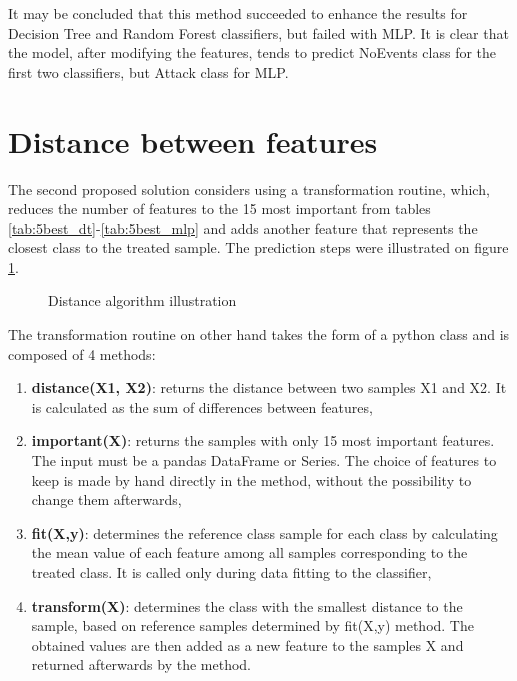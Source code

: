 It may be concluded that this method succeeded to enhance the results for Decision Tree and Random Forest classifiers, but failed with MLP. It is clear that the model, after modifying the features, tends to predict NoEvents class for the first two classifiers, but Attack class for MLP.  

\section{Distance between features}
The second proposed solution considers using a transformation routine, which, reduces the number of features to the 15 most important from tables \ref{tab:5best_dt}-\ref{tab:5best_mlp} and adds another feature that represents the closest class to the treated sample. The prediction steps were illustrated on figure \ref{fig:distill}.

\begin{figure}[H]
    \centering
    \caption{Distance algorithm illustration}
    \label{fig:distill}
\end{figure}

The transformation routine on other hand takes the form of a python class and is composed of 4 methods:
\begin{enumerate}
    \item \textbf{distance(X1, X2)}: returns the distance between two samples X1 and X2. It is calculated as the sum of differences between features,
    \item \textbf{important(X)}: returns the samples with only 15 most important features. The input must be a pandas DataFrame or Series. The choice of features to keep is made by hand directly in the method, without the possibility to change them afterwards,
    \item \textbf{fit(X,y)}: determines the reference class sample for each class by calculating the mean value of each feature among all samples corresponding to the treated class. It is called only during data fitting to the classifier,
    \item \textbf{transform(X)}: determines the class with the smallest distance to the sample, based on reference samples determined by fit(X,y) method. The obtained values are then added as a new feature to the samples X and returned afterwards by the method.
\end{enumerate}

